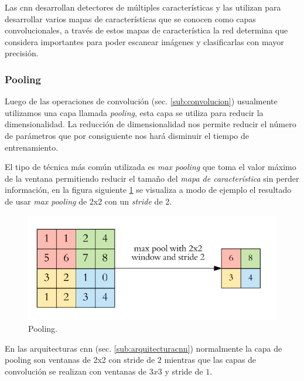 Las \ac{cnn} desarrollan detectores de múltiples características y las utilizan para desarrollar varios mapas de características que se conocen como capas convolucionales, a través de estos mapas de característica la red determina que  considera importantes para poder escanear imágenes y clasificarlas con mayor precisión.
\subsubsection{Pooling}\label{sub:pooling}

Luego de las operaciones de convolución (sec. \ref{sub:convolucion}) usualmente utilizamos una capa llamada \textit{pooling}, esta capa se utiliza para reducir la dimensionalidad. La reducción de dimensionalidad nos permite reducir el número de parámetros que por consiguiente nos hará disminuir el tiempo de entrenamiento.

El tipo de técnica más común utilizada es \textit{max pooling} que toma el valor máximo de la ventana permitiendo reducir el tamaño del \textit{mapa de característica} sin perder información, en la figura siguiente \ref{Fig:Pooling} se visualiza a modo de ejemplo el resultado de usar \textit{max pooling} de 2x2 con un \textit{stride} de 2.

\begin{figure}[H]
 \centering
  \includegraphics[scale=0.4,keepaspectratio=true,clip=true]{imagenes/MarcoTeorico/pooling_1.png}
  \caption{Pooling.} \label{Fig:Pooling}%
\end{figure}

En las arquitecturas \ac{cnn} (sec. \ref{sub:arquitecturacnn}) normalmente la capa de pooling son ventanas de 2x2 con stride de $2$ mientras que las capas de  convolución se realizan con ventanas de $3x3$ y stride de $1$. 

